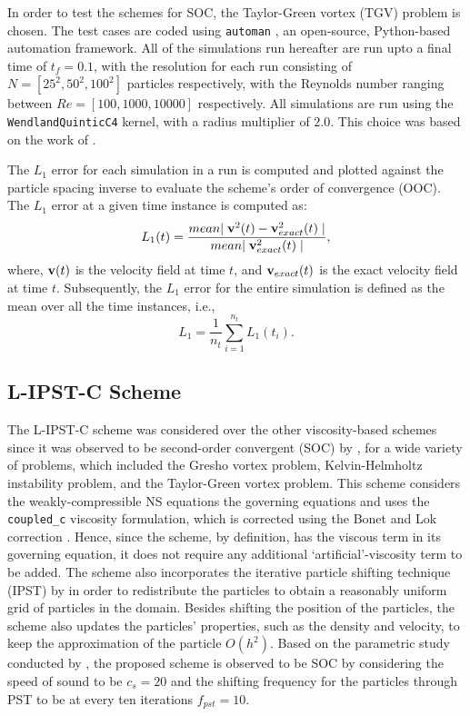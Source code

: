 In order to test the schemes for SOC, the Taylor-Green vortex (TGV) problem is chosen. The test cases are coded using \texttt{automan} \parencite{RamachandranAutoman2018}, an open-source, Python-based automation framework. All of the simulations run hereafter are run upto a final time of $t_f=0.1$, with the resolution for each run consisting of $N=[25^2, 50^2, 100^2]$ particles respectively, with the Reynolds number ranging between $Re=[100, 1000, 10000]$ respectively. All simulations are run using the \texttt{WendlandQuinticC4} kernel, with a radius multiplier of $2.0$. This choice was based on the work of \cite{Negi2022Techniques}.

The $L_1$ error for each simulation in a run is computed and plotted against the particle spacing inverse to evaluate the scheme's order of convergence (OOC). The $L_1$ error at a given time instance is computed as:
\begin{equation}
  L_1(t) = \frac{mean{\mid \mathbf{v}^2(t) - \mathbf{v}^2_{exact}(t) \mid}}{mean{\mid \mathbf{v}^2_{exact}(t) \mid}},
\end{equation}
where, $\mathbf{v}(t)$ is the velocity field at time $t$, and $\mathbf{v}_{exact}(t)$ is the exact velocity field at time $t$.
Subsequently, the $L_1$ error for the entire simulation is defined as the mean over all the time instances, i.e.,
\begin{equation}
  L_1 = \frac{1}{n_t} \sum_{i=1}^{n_t} L_1(t_i).
\end{equation}

\subsection{L-IPST-C Scheme}

The L-IPST-C scheme was considered over the other viscosity-based schemes since it was observed to be second-order convergent (SOC) by \cite{Negi2022Techniques}, for a wide variety of problems, which included the Gresho vortex problem, Kelvin-Helmholtz instability problem, and the Taylor-Green vortex problem. This scheme considers the weakly-compressible NS equations the governing equations and uses the \texttt{coupled\_c} viscosity formulation, which is corrected using the Bonet and Lok correction \parencite{bonet1999variational}. Hence, since the scheme, by definition, has the viscous term in its governing equation, it does not require any additional `artificial'-viscosity term to be added.
The scheme also incorporates the iterative particle shifting technique (IPST) by \cite{Huang_Long_Li_Liu_2019} in order to redistribute the particles to obtain a reasonably uniform grid of particles in the domain. Besides shifting the position of the particles, the scheme also updates the particles' properties, such as the density and velocity, to keep the approximation of the particle $O(h^2)$.
Based on the parametric study conducted by \cite{Negi2022Techniques}, the proposed scheme is observed to be SOC by considering the speed of sound to be $c_s = 20$ and the shifting frequency for the particles through PST to be at every ten iterations $f_{pst} = 10$.

